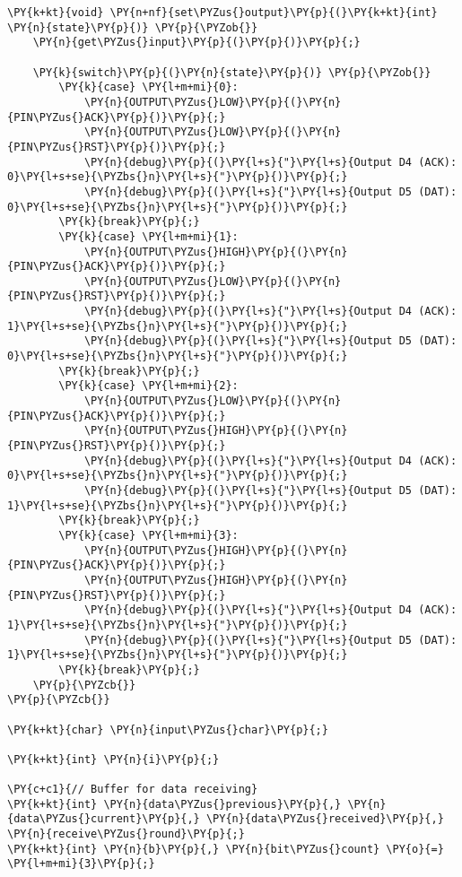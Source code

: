 \begin{Verbatim}[commandchars=\\\{\}]
\PY{k+kt}{void} \PY{n+nf}{set\PYZus{}output}\PY{p}{(}\PY{k+kt}{int} \PY{n}{state}\PY{p}{)} \PY{p}{\PYZob{}}
    \PY{n}{get\PYZus{}input}\PY{p}{(}\PY{p}{)}\PY{p}{;}

    \PY{k}{switch}\PY{p}{(}\PY{n}{state}\PY{p}{)} \PY{p}{\PYZob{}}
        \PY{k}{case} \PY{l+m+mi}{0}:
            \PY{n}{OUTPUT\PYZus{}LOW}\PY{p}{(}\PY{n}{PIN\PYZus{}ACK}\PY{p}{)}\PY{p}{;}
            \PY{n}{OUTPUT\PYZus{}LOW}\PY{p}{(}\PY{n}{PIN\PYZus{}RST}\PY{p}{)}\PY{p}{;}
            \PY{n}{debug}\PY{p}{(}\PY{l+s}{"}\PY{l+s}{Output D4 (ACK): 0}\PY{l+s+se}{\PYZbs{}n}\PY{l+s}{"}\PY{p}{)}\PY{p}{;}
            \PY{n}{debug}\PY{p}{(}\PY{l+s}{"}\PY{l+s}{Output D5 (DAT): 0}\PY{l+s+se}{\PYZbs{}n}\PY{l+s}{"}\PY{p}{)}\PY{p}{;}
        \PY{k}{break}\PY{p}{;}
        \PY{k}{case} \PY{l+m+mi}{1}:
            \PY{n}{OUTPUT\PYZus{}HIGH}\PY{p}{(}\PY{n}{PIN\PYZus{}ACK}\PY{p}{)}\PY{p}{;}
            \PY{n}{OUTPUT\PYZus{}LOW}\PY{p}{(}\PY{n}{PIN\PYZus{}RST}\PY{p}{)}\PY{p}{;}
            \PY{n}{debug}\PY{p}{(}\PY{l+s}{"}\PY{l+s}{Output D4 (ACK): 1}\PY{l+s+se}{\PYZbs{}n}\PY{l+s}{"}\PY{p}{)}\PY{p}{;}
            \PY{n}{debug}\PY{p}{(}\PY{l+s}{"}\PY{l+s}{Output D5 (DAT): 0}\PY{l+s+se}{\PYZbs{}n}\PY{l+s}{"}\PY{p}{)}\PY{p}{;}
        \PY{k}{break}\PY{p}{;}
        \PY{k}{case} \PY{l+m+mi}{2}:
            \PY{n}{OUTPUT\PYZus{}LOW}\PY{p}{(}\PY{n}{PIN\PYZus{}ACK}\PY{p}{)}\PY{p}{;}
            \PY{n}{OUTPUT\PYZus{}HIGH}\PY{p}{(}\PY{n}{PIN\PYZus{}RST}\PY{p}{)}\PY{p}{;}
            \PY{n}{debug}\PY{p}{(}\PY{l+s}{"}\PY{l+s}{Output D4 (ACK): 0}\PY{l+s+se}{\PYZbs{}n}\PY{l+s}{"}\PY{p}{)}\PY{p}{;}
            \PY{n}{debug}\PY{p}{(}\PY{l+s}{"}\PY{l+s}{Output D5 (DAT): 1}\PY{l+s+se}{\PYZbs{}n}\PY{l+s}{"}\PY{p}{)}\PY{p}{;}
        \PY{k}{break}\PY{p}{;}
        \PY{k}{case} \PY{l+m+mi}{3}:
            \PY{n}{OUTPUT\PYZus{}HIGH}\PY{p}{(}\PY{n}{PIN\PYZus{}ACK}\PY{p}{)}\PY{p}{;}
            \PY{n}{OUTPUT\PYZus{}HIGH}\PY{p}{(}\PY{n}{PIN\PYZus{}RST}\PY{p}{)}\PY{p}{;}
            \PY{n}{debug}\PY{p}{(}\PY{l+s}{"}\PY{l+s}{Output D4 (ACK): 1}\PY{l+s+se}{\PYZbs{}n}\PY{l+s}{"}\PY{p}{)}\PY{p}{;}
            \PY{n}{debug}\PY{p}{(}\PY{l+s}{"}\PY{l+s}{Output D5 (DAT): 1}\PY{l+s+se}{\PYZbs{}n}\PY{l+s}{"}\PY{p}{)}\PY{p}{;}
        \PY{k}{break}\PY{p}{;}
    \PY{p}{\PYZcb{}}
\PY{p}{\PYZcb{}}

\PY{k+kt}{char} \PY{n}{input\PYZus{}char}\PY{p}{;}

\PY{k+kt}{int} \PY{n}{i}\PY{p}{;}

\PY{c+c1}{// Buffer for data receiving}
\PY{k+kt}{int} \PY{n}{data\PYZus{}previous}\PY{p}{,} \PY{n}{data\PYZus{}current}\PY{p}{,} \PY{n}{data\PYZus{}received}\PY{p}{,} \PY{n}{receive\PYZus{}round}\PY{p}{;}
\PY{k+kt}{int} \PY{n}{b}\PY{p}{,} \PY{n}{bit\PYZus{}count} \PY{o}{=} \PY{l+m+mi}{3}\PY{p}{;}


\end{Verbatim}
